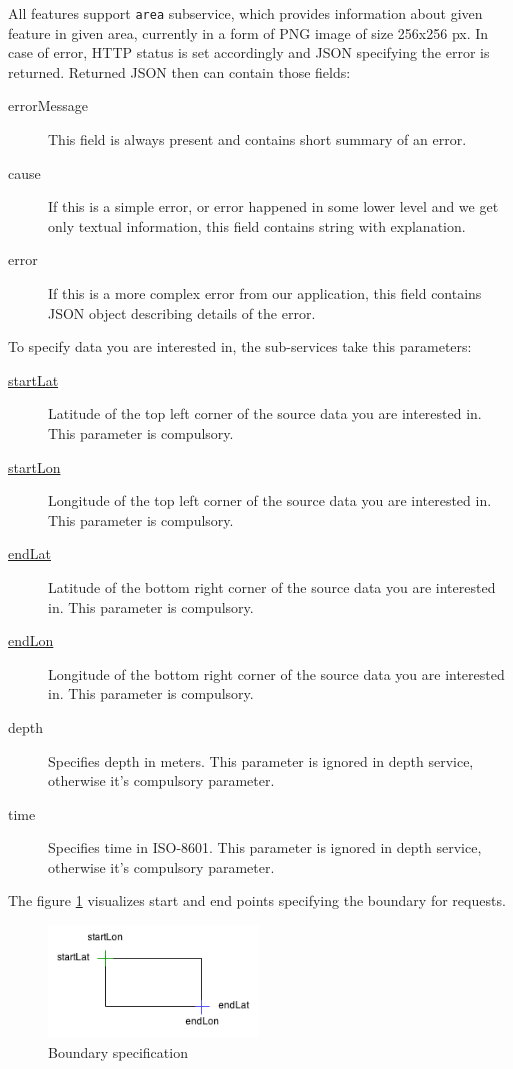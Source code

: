 \documentclass[11pt,a4paper,titlepage,oneside]{report}
\begin{document}
All features support \texttt{area} subservice, which provides information about given feature in given area, currently in a form of \gls{PNG} image of size 256x256 px. In case of error, \gls{HTTP} status is set accordingly and \gls{JSON} specifying the error is returned. Returned \gls{JSON} then can contain those fields:
\begin{description}
	\item[errorMessage] This field is always present and contains short summary of an error.
	\item[cause] If this is a simple error, or error happened in some lower level and we get only textual information, this field contains string with explanation.
	\item[error] If this is a more complex error from our application, this field contains \gls{JSON} object describing details of the error.
\end{description}

To specify data you are interested in, the sub-services take this parameters:
\begin{description}
	\item[\underline{startLat}] Latitude of the top left corner of the source data you are interested in. This parameter is compulsory.
	\item[\underline{startLon}] Longitude of the top left corner of the source data you are interested in. This parameter is compulsory.
	\item[\underline{endLat}] Latitude of the bottom right corner of the source data you are interested in. This parameter is compulsory.
	\item[\underline{endLon}] Longitude of the bottom right corner of the source data you are interested in. This parameter is compulsory.
	\item[depth] Specifies depth in meters. This parameter is ignored in depth service, otherwise it's compulsory parameter.
	\item[time] Specifies time in ISO-8601. This parameter is ignored in depth service, otherwise it's compulsory parameter.
\end{description}

The figure \ref{fig:rest_api_boundary} visualizes start and end points specifying the boundary for requests.

\begin{figure}[h]
	\centering
	\includegraphics[height=3cm]{img/REST_boundary.png}
	\caption{Boundary specification}
	\label{fig:rest_api_boundary}
\end{figure}
\end{document}
